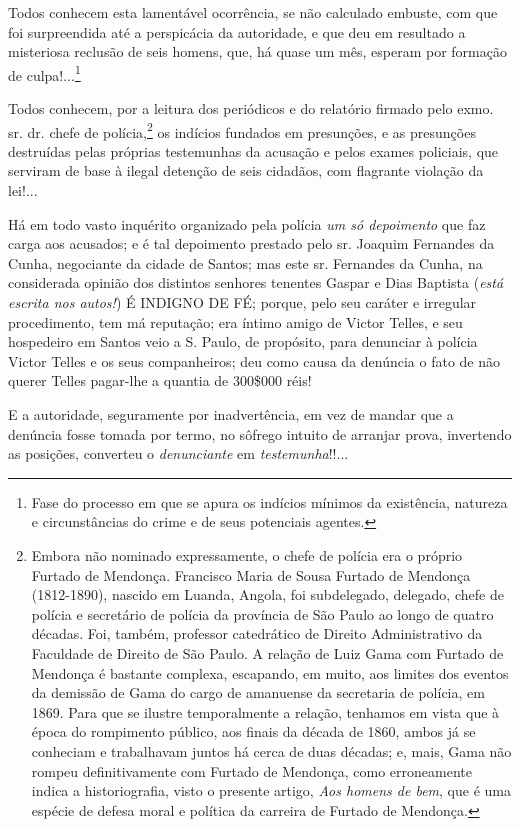 Todos conhecem esta lamentável ocorrência, se não calculado embuste, com
que foi surpreendida até a perspicácia da autoridade, e que deu em
resultado a misteriosa reclusão de seis homens, que, há quase um mês,
esperam por formação de culpa!...\footnote{Fase do processo em que se
  apura os indícios mínimos da existência, natureza e circunstâncias do
  crime e de seus potenciais agentes.}

Todos conhecem, por a leitura dos periódicos e do relatório firmado pelo
exmo. sr. dr. chefe de polícia,\footnote{Embora não nominado
  expressamente, o chefe de polícia era o próprio Furtado de Mendonça.
  Francisco Maria de Sousa Furtado de Mendonça (1812-1890), nascido em
  Luanda, Angola, foi subdelegado, delegado, chefe de polícia e
  secretário de polícia da província de São Paulo ao longo de quatro
  décadas. Foi, também, professor catedrático de Direito Administrativo
  da Faculdade de Direito de São Paulo. A relação de Luiz Gama com
  Furtado de Mendonça é bastante complexa, escapando, em muito, aos
  limites dos eventos da demissão de Gama do cargo de amanuense da
  secretaria de polícia, em 1869. Para que se ilustre temporalmente a
  relação, tenhamos em vista que à época do rompimento público, aos
  finais da década de 1860, ambos já se conheciam e trabalhavam juntos
  há cerca de duas décadas; e, mais, Gama não rompeu definitivamente com
  Furtado de Mendonça, como erroneamente indica a historiografia, visto
  o presente artigo, \emph{Aos homens de bem}, que é uma espécie de
  defesa moral e política da carreira de Furtado de Mendonça.} os
indícios fundados em presunções, e as presunções destruídas pelas
próprias testemunhas da acusação e pelos exames policiais, que serviram
de base à ilegal detenção de seis cidadãos, com flagrante violação da
lei!...

Há em todo vasto inquérito organizado pela polícia \emph{um só
depoimento} que faz carga aos acusados; e é tal depoimento prestado pelo
sr. Joaquim Fernandes da Cunha, negociante da cidade de Santos; mas este
sr. Fernandes da Cunha, na considerada opinião dos distintos senhores
tenentes Gaspar e Dias Baptista (\emph{está escrita nos autos!}) É
INDIGNO DE FÉ; porque, pelo seu caráter e irregular procedimento, tem má
reputação; era íntimo amigo de Victor Telles, e seu hospedeiro em Santos
veio a S. Paulo, de propósito, para denunciar à polícia Victor Telles e
os seus companheiros; deu como causa da denúncia o fato de não querer
Telles pagar-lhe a quantia de 300\$000 réis!

E a autoridade, seguramente por inadvertência, em vez de mandar que a
denúncia fosse tomada por termo, no sôfrego intuito de arranjar prova,
invertendo as posições, converteu o \emph{denunciante} em
\emph{testemunha}!!...

